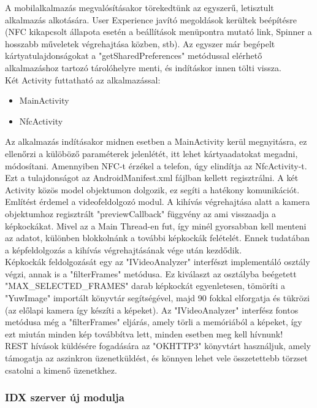 A mobilalkalmazás megvalósításakor törekedtünk az egyszerű, letisztult alkalmazás alkotására.
User Experience javító megoldások kerültek beépítésre (NFC kikapcsolt állapota esetén a beállítások menüpontra mutató link, Spinner a hosszabb műveletek végrehajtása közben, stb). Az egyszer már begépelt kártyatulajdonságokat a "getSharedPreferences" metódussal elérhető alkalmazáshoz tartozó tárolóhelyre menti, és indításkor innen tölti vissza.
\\Két Activity futtatható az alkalmazással:
\begin{itemize}
\item MainActivity
\item NfcActivity
\end{itemize}

Az alkalmazás indításakor midnen esetben a MainActivity kerül megnyitásra, ez ellenőrzi a külöböző paraméterek jelenlétét, itt lehet kártyaadatokat megadni, módosítani. Amennyiben NFC-t érzékel a telefon, úgy elindítja az NfcActivity-t. Ezt a tulajdonságot az AndroidManifest.xml fájlban kellett regisztrálni. A két Activity közös model objektumon dolgozik, ez segíti a hatékony komunikációt.
\\Említést érdemel a videofeldolgozó modul. A kihívás végrehajtása alatt a kamera objektumhoz regisztrált "previewCallback" függvény az ami visszaadja a képkockákat. Mivel az a Main Thread-en fut, így minél gyorsabban kell menteni az adatot, különben blokkolnánk a további képkockák felételét. Ennek tudatában a képfeldolgozás a kihívás végrehajtásának vége után kezdődik.\\
Képkockák feldolgozását egy az "IVideoAnalyzer" interfészt implementáló osztály végzi, annak is a "filterFrames" metódusa. Ez kiválaszt az osztályba beégetett "MAX\_SELECTED\_FRAMES" darab képkockát egyenletesen, tömöríti a "YuwImage" importált könyvtár segítségével, majd 90 fokkal elforgatja és tükrözi (az előlapi kamera így készíti a képeket). Az "IVideoAnalyzer" interfész fontos metódusa még a "filterFrames" eljárás, amely törli a memóriából a képeket, így ezt miután minden kép továbbítva lett, minden esetben meg kell hívnunk!
\\REST hívások küldésére fogadására az "OKHTTP3" könyvtárt használjuk, amely támogatja az aszinkron üzenetküldést, és könnyen lehet vele összetettebb törzset csatolni a kimenő üzenetkhez.

\subsubsection{IDX szerver új modulja}

